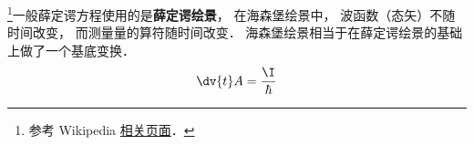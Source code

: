 
\footnote{参考 Wikipedia \href{https://en.wikipedia.org/wiki/Heisenberg_picture}{相关页面}．}一般薛定谔方程使用的是\textbf{薛定谔绘景}， 在海森堡绘景中， 波函数（态矢）不随时间改变， 而测量量的算符随时间改变． 海森堡绘景相当于在薛定谔绘景的基础上做了一个基底变换．
\begin{equation}
\dv{t}A = \frac{\I}{\hbar} 
\end{equation}
